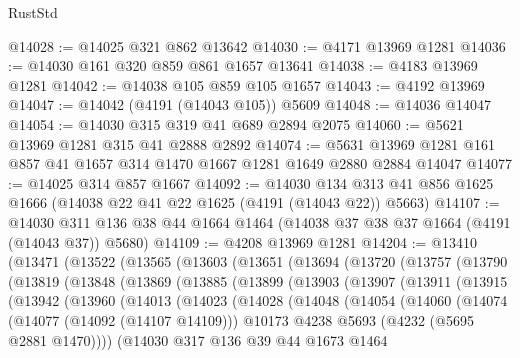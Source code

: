 \begin{lexlean}{RustStd}
\begin{coremodule}
@14028 := @14025 @321 @862 @13642
@14030 := @4171 @13969 @1281
@14036 := @14030 @161 @320 @859 @861 @1657 @13641
@14038 := @4183 @13969 @1281
@14042 := @14038 @105 @859 @105 @1657
@14043 := @4192 @13969
@14047 := @14042 (@4191 (@14043 @105)) @5609
@14048 := @14036 @14047
@14054 := @14030 @315 @319 @41 @689 @2894 @2075
@14060 := @5621 @13969 @1281 @315 @41 @2888 @2892
@14074 := @5631 @13969 @1281 @161 @857 @41 @1657 @314 @1470 @1667 @1281 @1649 @2880 @2884 @14047
@14077 := @14025 @314 @857 @1667
@14092 := @14030
    @134
    @313
    @41
    @856
    @1625
    @1666
    (@14038 @22 @41 @22 @1625 (@4191 (@14043 @22)) @5663)
@14107 := @14030 @311 @136 @38 @44 @1664 @1464 (@14038 @37 @38 @37 @1664 (@4191 (@14043 @37)) @5680)
@14109 := @4208 @13969 @1281
@14204 := @13410
    (@13471
      (@13522
        (@13565
          (@13603
            (@13651
              (@13694
                (@13720
                  (@13757
                    (@13790
                      (@13819
                        (@13848
                          (@13869
                            (@13885
                              (@13899
                                (@13903
                                  (@13907
                                    (@13911
                                      (@13915
                                        (@13942
                                          (@13960
                                            (@14013
                                              (@14023
                                                (@14028
                                                  (@14048
                                                    (@14054
                                                      (@14060
                                                        (@14074
                                                          (@14077 (@14092 (@14107 @14109)))
                                                          @10173
                                                          @4238
                                                          @5693
                                                          (@4232 (@5695 @2881 @1470))))
                                                      (@14030
                                                        @317
                                                        @136
                                                        @39
                                                        @44
                                                        @1673
                                                        @1464

\end{coremodule}
\end{lexlean}
